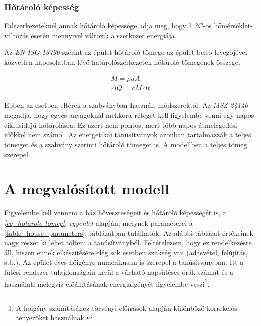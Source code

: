 \subsubsection*{Hőtároló képesség}


Falszerkezeteknél annak hőtároló képessége adja meg, hogy \SI{1}{\celsius}-os hőmérséklet-változás esetén mennyivel változik a szerkezet energiája.

Az \textit{EN ISO 13790} szerint az épület hőtároló tömege az épület belső levegőjével közvetlen kapcsolatban lévő határolószerkezetek hőtároló tömegének összege.

\begin{equation}\label{eq_hotarolo-tomeg}
\begin{aligned}
M= \rho d A\\[10pt]
\Delta Q= cM\Delta t
\end{aligned}
\end{equation}

Ebben az esetben eltérek a szabványban használt módszerektől. Az \textit{MSZ 24140} megadja, hogy egyes anyagoknál mekkora réteget kell figyelembe venni egy napos ciklusidejű hőtárolásra. Ez azért nem pontos, mert több napos átmelegedési időkkel nem számol. Az energetikai tanúsítványok azonban tartalmazzák a teljes tömeget és a szabvány szerinti hőtároló tömeget is. A modellben a teljes tömeg szerepel.




\begin{table}[H]
	\footnotesize
	\centering
	\caption{Jelölések}
	
	\label{tab:Nomenclature}
\end{table}

\section{A megvalósított modell}

Figyelembe kell vennem a ház hőveszteségeit és hőtároló képességét is, a \textit{\ref{eq_hotarolo-tomeg}. egyenlet} alapján, melynek paraméterei a \ref{table_house_parameters}. táblázatban találhatók.
Az alábbi táblázat értékeinek nagy részét ki lehet tölteni a tanúsítványból. Feltételezem, hogy ez rendelkezésre áll, hiszen ennek elkészítésére elég sok esetben szükség van (adásvétel, felújítás, stb.).
Az épület éves hőigénye numerikusan is szerepel a tanúsítványban. Itt a fűtési rendszer tulajdonságain kívül a várható napsütéses órák számát és a használati melegvíz előállításának energiaigényét figyelembe veszi\footnote{A hőigény számításához törvényi előírások alapján különböző korrekciós tényezőket használnak.}.

